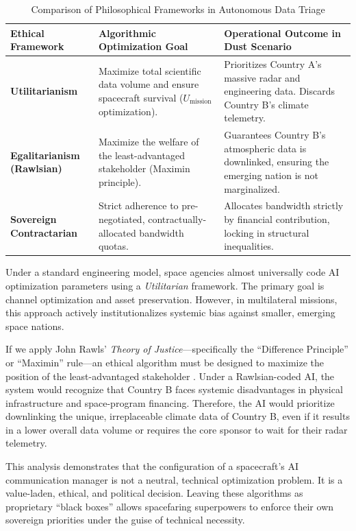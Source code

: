 \documentclass[final,5p,times,twocolumn]{elsarticle}
\begin{document}
\begin{table}[h!]
\centering
\caption{Comparison of Philosophical Frameworks in Autonomous Data Triage}
\label{tab:ethics}
\begin{tabular}{lp{6cm}p{6cm}}
\toprule
\textbf{Ethical Framework} & \textbf{Algorithmic Optimization Goal} & \textbf{Operational Outcome in Dust Scenario} \\
\midrule
\textbf{Utilitarianism} & Maximize total scientific data volume and ensure spacecraft survival ($U_{\text{mission}}$ optimization). & Prioritizes Country A's massive radar and engineering data. Discards Country B's climate telemetry. \\
\textbf{Egalitarianism (Rawlsian)} & Maximize the welfare of the least-advantaged stakeholder (Maximin principle). & Guarantees Country B's atmospheric data is downlinked, ensuring the emerging nation is not marginalized. \\
\textbf{Sovereign Contractarian} & Strict adherence to pre-negotiated, contractually-allocated bandwidth quotas. & Allocates bandwidth strictly by financial contribution, locking in structural inequalities. \\
\bottomrule
\end{tabular}
\end{table}

Under a standard engineering model, space agencies almost universally code AI optimization parameters using a \textit{Utilitarian} framework. The primary goal is channel optimization and asset preservation. However, in multilateral missions, this approach actively institutionalizes systemic bias against smaller, emerging space nations.

If we apply John Rawls' \textit{Theory of Justice}---specifically the ``Difference Principle'' or ``Maximin'' rule---an ethical algorithm must be designed to maximize the position of the least-advantaged stakeholder \citep{marks2022algorithmic}. Under a Rawlsian-coded AI, the system would recognize that Country B faces systemic disadvantages in physical infrastructure and space-program financing. Therefore, the AI would prioritize downlinking the unique, irreplaceable climate data of Country B, even if it results in a lower overall data volume or requires the core sponsor to wait for their radar telemetry.

This analysis demonstrates that the configuration of a spacecraft's AI communication manager is not a neutral, technical optimization problem. It is a value-laden, ethical, and political decision. Leaving these algorithms as proprietary ``black boxes'' allows spacefaring superpowers to enforce their own sovereign priorities under the guise of technical necessity.
\end{document}

